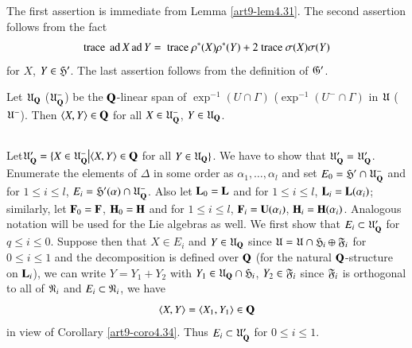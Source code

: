 The first assertion is immediate from Lemma \ref{art9-lem4.31}. The second assertion follows from the fact
$$
\text{trace } \operatorname{ad} X \operatorname{ad} Y = \text{ trace } \rho^\ast (X) \rho^\ast (Y)+ 2 \text{ trace } \sigma (X) \sigma (Y)
$$ 
for $X$, $Y \in \mathfrak{H}'$. The last assertion follows from the definition of $\mathfrak{G}'$.

\begin{proposition}\label{art9-prop4.35}
Let $\mathfrak{U}_{\mathbf{Q}}$ (\resp $\mathfrak{U}^-_{\mathbf{Q}}$) be the $\mathbf{Q}$-linear span of $\exp^{-1} (U \cap \Gamma)$ (\resp $\exp^{-1} (U^- \cap \Gamma)$ in $\mathfrak{U}$ (\resp $\mathfrak{U}^-$). Then $\langle X, Y \rangle \in \mathbf{Q}$ for all $X \in\mathfrak{U}^-_{\mathbf{Q}}$, $Y \in \mathfrak{U}_{\mathbf{Q}}$.
\end{proposition}

\subsection{}\label{art9-subsec4.36}
Let\pageoriginale $\mathfrak{U}'_{\mathbf{Q}} = \{X \in \mathfrak{U}^-_{\mathbf{Q}} \big| \langle X, Y \rangle \in \mathbf{Q}$ for all $Y \in \mathfrak{U}_{\mathbf{Q}}\}$. We have to show that $\mathfrak{U}'_{\mathbf{Q}} = \mathfrak{U}'_{\mathbf{Q}}$. Enumerate the elements of $\Delta$ in some order as $\alpha_1, \ldots, \alpha_l$ and set $E_0 = \mathfrak{H}' \cap\mathfrak{U}^-_{\mathbf{Q}}$ and for $1 \leqslant i \leqslant l$, $E_i = \mathfrak{H}'(\alpha) \cap\mathfrak{U}^-_{\mathbf{Q}}$. Also let $\mathbf{L}_0 = \mathbf{L}$ and for $1 \leqslant i \leqslant l$, $\mathbf{L}_i = \mathbf{L}(\alpha_i)$; similarly, let $\mathbf{F}_0 = \mathbf{F}$, $\mathbf{H}_0 = \mathbf{H}$ and for $1 \leqslant i \leqslant l$, $\mathbf{F}_i = \mathbf{U} (\alpha_i)$, $\mathbf{H}_i = \mathbf{H} (\alpha_i)$. Analogous notation will be used for the Lie algebras as well. We first show that $E_i \subset \mathfrak{U}'_{\mathbf{Q}}$ for $q \leqslant i \leqslant 0$. Suppose then that $X \in E_i$ and $Y \in \mathfrak{U}_{\mathbf{Q}}$ since $\mathfrak{U} = \mathfrak{U} \cap \mathfrak{H}_i \oplus \mathfrak{F}_i$ for $0 \leqslant i \leqslant 1$ and the decomposition is defined over $\mathbf{Q}$ (for the natural $\mathbf{Q}$-structure on $\mathbf{L}_i$), we can write $Y = Y_1 + Y_2$ with $Y_1 \in \mathfrak{U}_{\mathbf{Q}} \cap \mathfrak{H}_i$, $Y_2 \in \mathfrak{F}_i$ since $\mathfrak{F}_i$ is orthogonal to all of $\mathfrak{N}_i$ and $E_i \subset \mathfrak{N}_i$, we have
$$
\langle X, Y \rangle = \langle X_1 , Y_1\rangle \in \mathbf{Q}
$$
in view of Corollary \ref{art9-coro4.34}. Thus $E_i \subset \mathfrak{U}'_{\mathbf{Q}}$ for $0\leqslant i \leqslant 1$.

